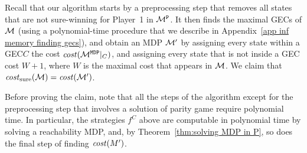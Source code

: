\documentclass[runningheads,a4paper]{llncs}
\newcommand{\set}[1]{{\{#1\}}}
\newcommand{\stam}[1]{}
\newcommand{\M}{{\cal M}}
\renewcommand{\P}{{\mathtt P}}
\newcommand{\MDP}{{\mathtt{MDP}}}
\newcommand{\cost}{{\it cost}}
\newcommand{\MDPcost}{{\it cost}}
\newcommand{\costs}{{\it cost}_{\rm sure}}
\newcommand{\gec}{{GEC}\xspace}
\newcommand{\gecs}{{GECs}\xspace}
\begin{document}
Recall that our algorithm starts by a preprocessing step that removes all states that are not sure-winning for Player~1 in $\M^{\P}$.
It then finds the maximal \gecs of $\M$ (using a polynomial-time procedure that we describe in Appendix~\ref{app inf memory finding gecs}), and obtain an MDP $\M'$ by assigning every state within a \gec $C$ the cost $\cost(\M^{\MDP}|_C)$, and assigning every state that is not inside a \gec cost $W+1$, where $W$ is the maximal cost that appears in $\M$. We claim that $\costs(\M)=\cost(\M')$.
 
Before proving the claim, note that all the steps of the algorithm except for the preprocessing step that involves a solution of parity game require polynomial time. In particular, the strategies $f^C$ above are computable in polynomial time by solving a reachability MDP, and, by Theorem~\ref{thm:solving MDP in P}, so does the final step of finding $\cost(M')$. 

\stam{
Next, intuitively, we assign every edge that is not inside a \gec a high cost. Since our cost function is on states, we add a state on each such edge, as follows. For every transition $s'=\delta_i(s,a)$ for $i\in \set{1,2}$ such that $s$ and $s'$ are not in the same \gec, or not in a \gec at all, we add a state $q_{s,a,s'}$ that replaces the transition from $s$ to $s'$ by two transitions going through $q_{s,a,s'}$. We set $\MDPcost(q_{s,a,s'})=2W+1$, where $W$ is the maximal cost that appears in $\M$. We take $2W+1$ since a transition through $q_{s,a,s'}$ consists of two transitions, instead of the original transition in $\M$.
Thus, we obtain an MDP $\M'$, and we return $\cost(\M')$.
}
\end{document}
